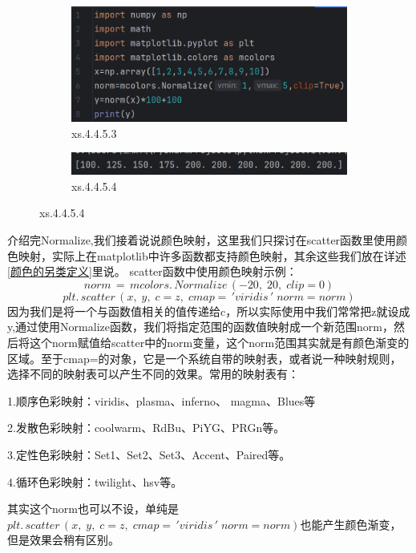 \documentclass[12pt]{article}
\begin{document}
\begin{figure}[H]
    \centering
    \begin{subfigure}[b]{0.6\textwidth}
        \includegraphics[width=\textwidth]{normalize program3.png} %
        \caption{xs.4.4.5.3}
        \label{fig:line-graph2}
    \end{subfigure}
    \hfill
    \begin{subfigure}[b]{0.6\textwidth}
        \includegraphics[width=\textwidth]{normalize output3.png} %
        \caption{xs.4.4.5.4}
        \label{fig:line-graph2-pic2}
    \end{subfigure}
\end{figure}
介绍完Normalize,我们接着说说颜色映射，这里我们只探讨在scatter函数里使用颜色映射，实际上在matplotlib中许多函数都支持颜色映射，其余这些我们放在详述\ref{颜色的另类定义}里说。
scatter函数中使用颜色映射示例：
\[norm\,=\,mcolors.\,Normalize\,(-20,\;20,\;clip=0)\]
\[plt.\,scatter\,(x,\; y, \;c=z, \;cmap=\,'viridis\,'\;norm=norm)\]
因为我们是将一个与函数值相关的值传递给c，所以实际使用中我们常常把z就设成y,通过使用Normalize函数，我们将指定范围的函数值映射成一个新范围norm，然后将这个norm赋值给scatter中的norm变量，这个norm范围其实就是有颜色渐变的区域。至于cmap=的对象，它是一个系统自带的映射表，或者说一种映射规则，选择不同的映射表可以产生不同的效果。常用的映射表有：

1.顺序色彩映射：viridis、plasma、inferno、 magma、Blues等

2.发散色彩映射：coolwarm、RdBu、PiYG、PRGn等。

3.定性色彩映射：Set1、Set2、Set3、Accent、Paired等。

4.循环色彩映射：twilight、hsv等。

其实这个norm也可以不设，单纯是\(plt.\,scatter\,(x,\; y, \;c=z, \;cmap=\,'viridis\,'\;norm=norm)\)也能产生颜色渐变，但是效果会稍有区别。
\end{document}
